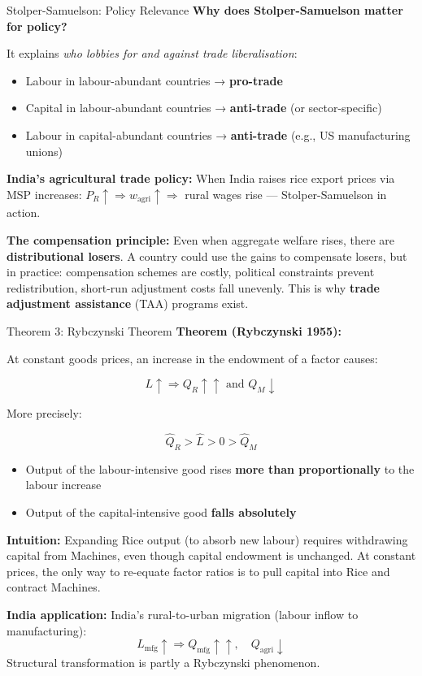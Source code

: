 \documentclass[
  ignorenonframetext,
  aspectratio=169,
]{beamer}
\makeatletter
\providecommand{\tightlist}{%
  \setlength{\itemsep}{0pt}\setlength{\parskip}{0pt}}
\let\quarto@originallabel\label
\DeclareRobustCommand*{\label}[1]{\quarto@originallabel{#1}}
\makeatother
\begin{document}
\begin{frame}{Stolper-Samuelson: Policy Relevance}
\label{stolper-samuelson-policy-relevance}
\textbf{Why does Stolper-Samuelson matter for policy?}

It explains \emph{who lobbies for and against trade liberalisation}:

\begin{itemize}
\tightlist
\item
  Labour in labour-abundant countries → \textbf{pro-trade}
\item
  Capital in labour-abundant countries → \textbf{anti-trade} (or
  sector-specific)
\item
  Labour in capital-abundant countries → \textbf{anti-trade} (e.g., US
  manufacturing unions)
\end{itemize}

\textbf{India's agricultural trade policy:} When India raises rice
export prices via MSP increases:
\(P_R \uparrow \Rightarrow w_{\text{agri}} \uparrow \Rightarrow\) rural
wages rise --- Stolper-Samuelson in action.

\textbf{The compensation principle:} Even when aggregate welfare rises,
there are \textbf{distributional losers}. A country could use the gains
to compensate losers, but in practice: compensation schemes are costly,
political constraints prevent redistribution, short-run adjustment costs
fall unevenly. This is why \textbf{trade adjustment assistance} (TAA)
programs exist.
\end{frame}

\begin{frame}{Theorem 3: Rybczynski Theorem}
\label{theorem-3-rybczynski-theorem}
\textbf{Theorem (Rybczynski 1955):}

At constant goods prices, an increase in the endowment of a factor
causes:

\[L \uparrow \Rightarrow Q_R \uparrow\uparrow \text{ and } Q_M \downarrow\]

More precisely:

\[\hat{Q}_R > \hat{L} > 0 > \hat{Q}_M\]

\begin{itemize}
\tightlist
\item
  Output of the labour-intensive good rises \textbf{more than
  proportionally} to the labour increase
\item
  Output of the capital-intensive good \textbf{falls absolutely}
\end{itemize}

\textbf{Intuition:} Expanding Rice output (to absorb new labour)
requires withdrawing capital from Machines, even though capital
endowment is unchanged. At constant prices, the only way to re-equate
factor ratios is to pull capital into Rice and contract Machines.

\textbf{India application:} India's rural-to-urban migration (labour
inflow to manufacturing):
\[L_{\text{mfg}} \uparrow \Rightarrow Q_{\text{mfg}} \uparrow\uparrow, \quad Q_{\text{agri}} \downarrow\]
Structural transformation is partly a Rybczynski phenomenon.
\end{frame}
\end{document}
